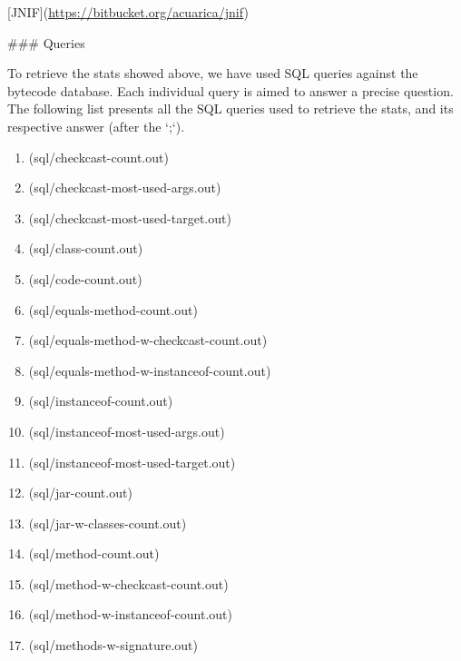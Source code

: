[JNIF](\url{https://bitbucket.org/acuarica/jnif}) 

\#\#\# Queries 

To retrieve the stats showed above, 
we have used SQL queries against the bytecode database. 
Each individual query is aimed to answer a precise question. 
The following list presents all the SQL queries used to retrieve the stats, 
and its respective answer (after the `;`). 

\begin{enumerate}
\item{}(sql/checkcast-count.out)
\label{sec:org73434e9}
\item{}(sql/checkcast-most-used-args.out)
\label{sec:org11f79e5}
\item{}(sql/checkcast-most-used-target.out)
\label{sec:org8af056a}
\item{}(sql/class-count.out)
\label{sec:org296e0e1}
\item{}(sql/code-count.out)
\label{sec:org42a88b4}
\item{}(sql/equals-method-count.out)
\label{sec:org863b025}
\item{}(sql/equals-method-w-checkcast-count.out)
\label{sec:org5d64cc5}
\item{}(sql/equals-method-w-instanceof-count.out)
\label{sec:org1f42d6e}
\item{}(sql/instanceof-count.out)
\label{sec:orgf789f5d}
\item{}(sql/instanceof-most-used-args.out)
\label{sec:orga81841d}
\item{}(sql/instanceof-most-used-target.out)
\label{sec:org545e09b}
\item{}(sql/jar-count.out)
\label{sec:org7bdee61}
\item{}(sql/jar-w-classes-count.out)
\label{sec:orga0de959}
\item{}(sql/method-count.out)
\label{sec:org5b58bd8}
\item{}(sql/method-w-checkcast-count.out)
\label{sec:org7d1f17e}
\item{}(sql/method-w-instanceof-count.out)
\label{sec:org06bc895}
\item{}(sql/methods-w-signature.out)
\label{sec:org64899a1}
\end{enumerate}

